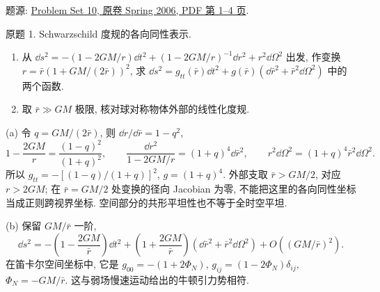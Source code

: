 题源: \href{https://ocw.mit.edu/courses/8-962-general-relativity-spring-2020/resources/mit8_962s20_pset10/}{Problem Set 10, 原卷 Spring 2006, PDF 第 1--4 页}.

\begin{exercise}\label{ps:10.1}
原题 1. Schwarzschild 度规的各向同性表示.
\begin{enumerate}[label=(\alph*)]
\item 从 $\dd s^2=-(1-2GM/r)\dd t^2+(1-2GM/r)^{-1}\dd r^2+r^2\dd\Omega^2$ 出发, 作变换 $r=\bar r(1+GM/(2\bar r))^2$, 求
$\dd s^2=g_{tt}(\bar r)\dd t^2+g(\bar r)(\dd\bar r^2+\bar r^2\dd\Omega^2)$ 中的两个函数.
\item 取 $\bar r\gg GM$ 极限, 核对球对称物体外部的线性化度规.
\end{enumerate}
\end{exercise}
\begin{solution}
(a) 令 $q=GM/(2\bar r)$, 则 $\dd r/\dd\bar r=1-q^2$,
\[
1-\frac{2GM}{r}=\frac{(1-q)^2}{(1+q)^2},\qquad
\frac{\dd r^2}{1-2GM/r}=(1+q)^4\dd\bar r^2,
\qquad r^2\dd\Omega^2=(1+q)^4\bar r^2\dd\Omega^2.
\]
所以 $g_{tt}=-[(1-q)/(1+q)]^2$, $g=(1+q)^4$. 外部支取 $\bar r>GM/2$, 对应 $r>2GM$; 在 $\bar r=GM/2$ 处变换的径向 Jacobian 为零, 不能把这里的各向同性坐标当成正则跨视界坐标. 空间部分的共形平坦性也不等于全时空平坦.

(b) 保留 $GM/\bar r$ 一阶,
\[
\dd s^2=-\left(1-\frac{2GM}{\bar r}\right)\dd t^2+
\left(1+\frac{2GM}{\bar r}\right)(\dd\bar r^2+\bar r^2\dd\Omega^2)
+O((GM/\bar r)^2).
\]
在笛卡尔空间坐标中, 它是 $g_{00}=-(1+2\Phi_N)$, $g_{ij}=(1-2\Phi_N)\delta_{ij}$, $\Phi_N=-GM/\bar r$. 这与弱场慢速运动给出的牛顿引力势相符.
\end{solution}

